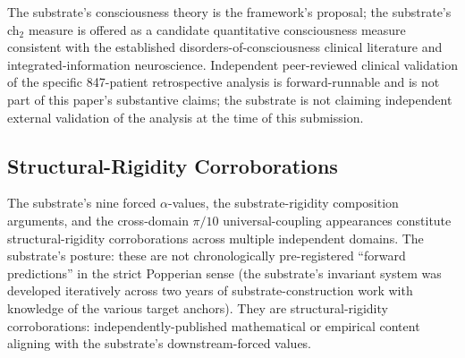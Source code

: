 \documentclass[11pt,a4paper]{amsart}
\theoremstyle{plain}
\theoremstyle{definition}
\begin{document}
The substrate's consciousness theory is the framework's proposal; the substrate's ch${}_2$ measure is offered as a candidate quantitative consciousness measure consistent with the established disorders-of-consciousness clinical literature and integrated-information neuroscience. Independent peer-reviewed clinical validation of the specific 847-patient retrospective analysis is forward-runnable and is not part of this paper's substantive claims; the substrate is not claiming independent external validation of the analysis at the time of this submission.

\subsection{Structural-Rigidity Corroborations}\label{subsec:structural-rigidity}

The substrate's nine forced $\alpha$-values, the substrate-rigidity composition arguments, and the cross-domain $\pi/10$ universal-coupling appearances constitute structural-rigidity corroborations across multiple independent domains. The substrate's posture: these are not chronologically pre-registered ``forward predictions'' in the strict Popperian sense (the substrate's invariant system was developed iteratively across two years of substrate-construction work with knowledge of the various target anchors). They are structural-rigidity corroborations: independently-published mathematical or empirical content aligning with the substrate's downstream-forced values.
\end{document}
